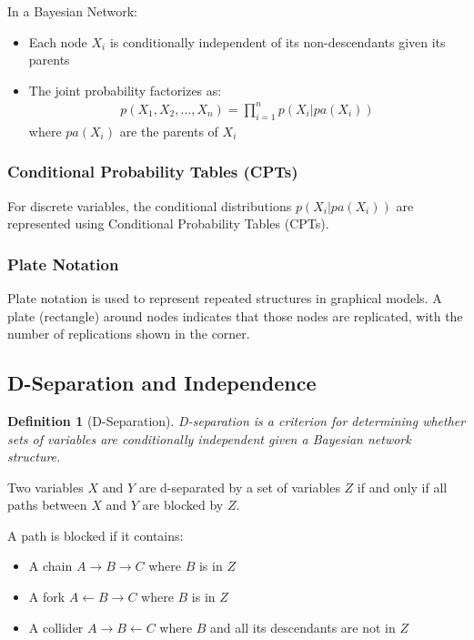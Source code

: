 \documentclass{article}
\newtheorem{definition}{Definition}
\begin{document}
In a Bayesian Network:
\begin{itemize}
\item Each node $X_i$ is conditionally independent of its non-descendants given its parents
\item The joint probability factorizes as:
\begin{align}
p(X_1, X_2, \ldots, X_n) = \prod_{i=1}^{n}p(X_i|pa(X_i))
\end{align}
where $pa(X_i)$ are the parents of $X_i$
\end{itemize}

\subsubsection{Conditional Probability Tables (CPTs)}
For discrete variables, the conditional distributions $p(X_i|pa(X_i))$ are represented using Conditional Probability Tables (CPTs).

\subsubsection{Plate Notation}
Plate notation is used to represent repeated structures in graphical models. A plate (rectangle) around nodes indicates that those nodes are replicated, with the number of replications shown in the corner.

\subsection{D-Separation and Independence}
\begin{definition}[D-Separation]
D-separation is a criterion for determining whether sets of variables are conditionally independent given a Bayesian network structure.
\end{definition}

Two variables $X$ and $Y$ are d-separated by a set of variables $Z$ if and only if all paths between $X$ and $Y$ are blocked by $Z$.

A path is blocked if it contains:
\begin{itemize}
\item A chain $A \rightarrow B \rightarrow C$ where $B$ is in $Z$
\item A fork $A \leftarrow B \rightarrow C$ where $B$ is in $Z$
\item A collider $A \rightarrow B \leftarrow C$ where $B$ and all its descendants are not in $Z$
\end{itemize}
\end{document}
